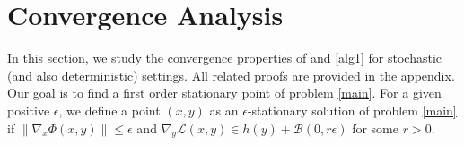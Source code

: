\documentclass[letterpaper,11 pt]{article}
\newtheorem{remark}{Remark}
\newtheorem{assumption}{Assumption}
\def\ml{\mathcal L}
\newcommand{\zizi}[1]{{\color{black}#1}}
\begin{document}
 
\section{Convergence Analysis}\label{sec:conv}
In this section, we study the convergence properties of  and \ref{alg1} for stochastic (and also deterministic) settings. All related proofs are provided in the appendix. Our goal is to find a first order stationary point of problem \eqref{main}. For a given positive $\epsilon$, we define a point $(x,y)$ as an $\epsilon$-stationary solution of problem \eqref{main} if $\|\nabla_x\Phi(x,y)\|\leq \epsilon$ and $\nabla_y\mathcal L(x,y)\in h(y)+\mathcal B(0,r\epsilon)$ for some $r>0$. 
\end{document}
